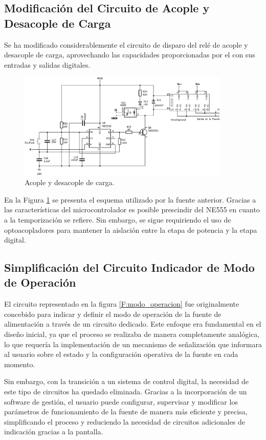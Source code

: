 \subsection{Modificación del Circuito de Acople y Desacople de Carga}\par 
Se ha modificado considerablemente el circuito de disparo del relé de acople y desacople de carga, aprovechando las capacidades proporcionadas por el  con sus entradas y salidas digitales.\par
\begin{figure}[H]
    \centering
    \includegraphics[width=0.9\textwidth]{./imagenes/conexion_carga.PNG}
    \caption{Acople y desacople de carga.}
    \label{F:conexion_carga}
\end{figure}\par 
En la Figura \ref{F:conexion_carga} se presenta el esquema utilizado por la fuente anterior. Gracias a las características del microcontrolador es posible prescindir del NE555 en cuanto a la temporización se refiere. Sin embargo, se sigue requiriendo el uso de optoacopladores para mantener la aislación entre la etapa de potencia y la etapa digital.\par

\subsection{Simplificación del Circuito Indicador de Modo de Operación}
El circuito representado en la figura \ref{F:modo_operacion} fue originalmente concebido para indicar y definir el modo de operación de la fuente de alimentación a través de un circuito dedicado. Este enfoque era fundamental en el diseño inicial, ya que el proceso se realizaba de manera completamente analógica, lo que requería la implementación de un mecanismo de señalización que informara al usuario sobre el estado y la configuración operativa de la fuente en cada momento.\par
Sin embargo, con la transición a un sistema de control digital, la necesidad de este tipo de circuitos ha quedado eliminada. Gracias a la incorporación de un software de gestión, el usuario puede configurar, supervisar y modificar los parámetros de funcionamiento de la fuente de manera más eficiente y precisa, simplificando el proceso y reduciendo la necesidad de circuitos adicionales de indicación gracias a la pantalla.\par

